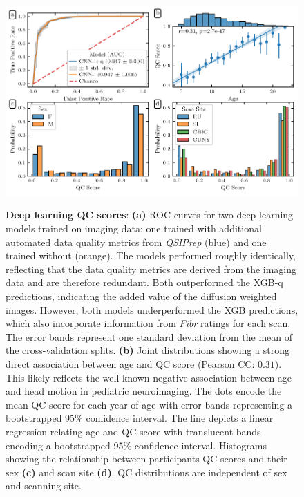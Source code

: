 \documentclass[fleqn,10pt,inline]{wlscirep}
\begin{document}
\begin{figure}[!t]
    {\label{fig:dl-qc:roc}}
    {\label{fig:dl-qc:joint}}
    {\label{fig:dl-qc:hist:sex}}
    {\label{fig:dl-qc:hist:site}}
    \centering
    \includegraphics[width=\linewidth]{deep-learning-qc/deep_learning_qc.pdf}
    \caption{%
        {\bf Deep learning QC scores}:
        \textbf{(a)} ROC curves for two deep learning models trained on imaging data: one trained with
        additional automated data quality metrics from \emph{QSIPrep} (blue) and one
        trained without (orange). The models performed roughly identically,
        reflecting that the data quality metrics are derived from the imaging data and are therefore redundant. Both outperformed the XGB-q predictions, indicating the
        added value of the diffusion weighted images. However, both models
        underperformed the XGB predictions, which also incorporate
        information from \emph{Fibr} ratings for each scan. The error bands
        represent one standard deviation from the mean of the cross-validation
        splits.
        \textbf{(b)} Joint distributions showing a strong direct association
        between age and QC score (Pearson CC: $0.31$). This likely reflects the well-known negative
        association between age and head motion in pediatric neuroimaging.
        The dots encode the mean QC score for each year of age with error bands
        representing a bootstrapped 95\% confidence interval. The line depicts
        a linear regression relating age and QC score with translucent bands
        encoding a bootstrapped 95\% confidence interval.
        Histograms showing the relationship between participants QC scores and
        their sex \textbf{(c)} and scan site \textbf{(d)}. QC distributions are independent
        of sex and scanning site.
    }
    \label{fig:dl-qc}
\end{figure}
\end{document}
